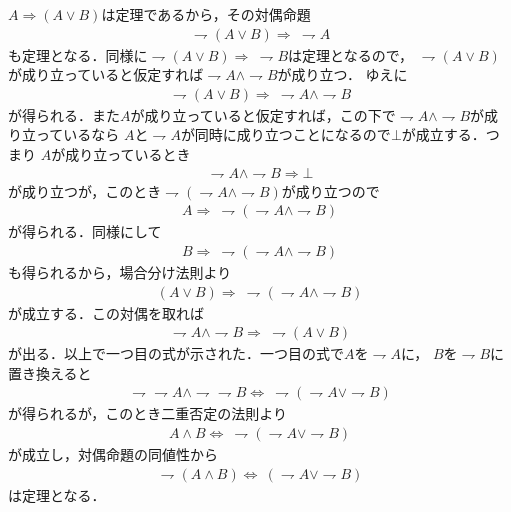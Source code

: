 	\begin{prf}
		$A \Longrightarrow (A \vee B)$は定理であるから，その対偶命題
		\begin{align}
			\rightharpoondown (A \vee B) \Longrightarrow\ \rightharpoondown A
		\end{align}
		も定理となる．同様に$\rightharpoondown (A \vee B) \Longrightarrow\ \rightharpoondown B$は定理となるので，
		$\rightharpoondown (A \vee B)$が成り立っていると仮定すれば$\rightharpoondown A \wedge \rightharpoondown B$が成り立つ．
		ゆえに
		\begin{align}
			\rightharpoondown (A \vee B) \Longrightarrow\ \rightharpoondown A \wedge \rightharpoondown B
		\end{align}
		が得られる．また$A$が成り立っていると仮定すれば，この下で$\rightharpoondown A \wedge \rightharpoondown B$が成り立っているなら
		$A$と$\rightharpoondown A$が同時に成り立つことになるので$\bot$が成立する．つまり
		$A$が成り立っているとき
		\begin{align}
			\rightharpoondown A \wedge \rightharpoondown B \Longrightarrow \bot
		\end{align}
		が成り立つが，このとき$\rightharpoondown(\rightharpoondown A \wedge \rightharpoondown B)$が成り立つので
		\begin{align}
			A \Longrightarrow\ \rightharpoondown(\rightharpoondown A \wedge \rightharpoondown B)
		\end{align}
		が得られる．同様にして
		\begin{align}
			B \Longrightarrow\ \rightharpoondown(\rightharpoondown A \wedge \rightharpoondown B)
		\end{align}
		も得られるから，場合分け法則より
		\begin{align}
			(A \vee B) \Longrightarrow\ \rightharpoondown(\rightharpoondown A \wedge \rightharpoondown B)
		\end{align}
		が成立する．この対偶を取れば
		\begin{align}
			\rightharpoondown A \wedge \rightharpoondown B
			\Longrightarrow\ \rightharpoondown (A \vee B)
		\end{align}
		が出る．以上で一つ目の式が示された．一つ目の式で$A$を$\rightharpoondown A$に，
		$B$を$\rightharpoondown B$に置き換えると
		\begin{align}
			\rightharpoondown \rightharpoondown A \wedge \rightharpoondown \rightharpoondown B
			\Longleftrightarrow\ \rightharpoondown (\rightharpoondown A \vee \rightharpoondown B)
		\end{align}
		が得られるが，このとき二重否定の法則より
		\begin{align}
			A \wedge B
			\Longleftrightarrow\ \rightharpoondown (\rightharpoondown A \vee \rightharpoondown B)
		\end{align}
		が成立し，対偶命題の同値性から
		\begin{align}
			\rightharpoondown (A \wedge B)
			\Longleftrightarrow\ (\rightharpoondown A \vee \rightharpoondown B)
		\end{align}
		は定理となる．
		\QED
	\end{prf}
	
